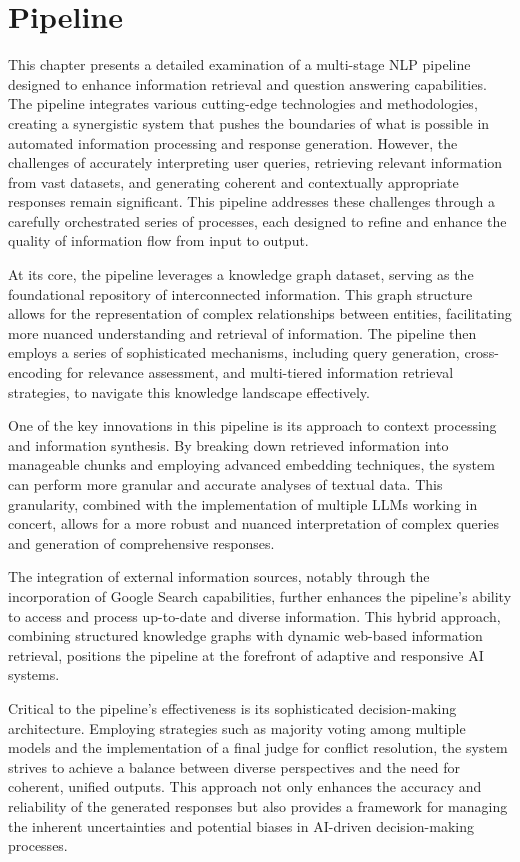\chapter{Pipeline}\label{ch:pipeline}
This chapter presents a detailed examination of a multi-stage NLP pipeline designed to enhance information retrieval and question answering capabilities.
The pipeline integrates various cutting-edge technologies and methodologies, creating a synergistic system that pushes the boundaries of what is possible in automated information processing and response generation.
However, the challenges of accurately interpreting user queries, retrieving relevant information from vast datasets, and generating coherent and contextually appropriate responses remain significant.
This pipeline addresses these challenges through a carefully orchestrated series of processes, each designed to refine and enhance the quality of information flow from input to output.

At its core, the pipeline leverages a knowledge graph dataset, serving as the foundational repository of interconnected information.
This graph structure allows for the representation of complex relationships between entities, facilitating more nuanced understanding and retrieval of information.
The pipeline then employs a series of sophisticated mechanisms, including query generation, cross-encoding for relevance assessment, and multi-tiered information retrieval strategies, to navigate this knowledge landscape effectively.

One of the key innovations in this pipeline is its approach to context processing and information synthesis.
By breaking down retrieved information into manageable chunks and employing advanced embedding techniques, the system can perform more granular and accurate analyses of textual data.
This granularity, combined with the implementation of multiple LLMs working in concert, allows for a more robust and nuanced interpretation of complex queries and generation of comprehensive responses.

The integration of external information sources, notably through the incorporation of Google Search capabilities, further enhances the pipeline's ability to access and process up-to-date and diverse information.
This hybrid approach, combining structured knowledge graphs with dynamic web-based information retrieval, positions the pipeline at the forefront of adaptive and responsive AI systems.

Critical to the pipeline's effectiveness is its sophisticated decision-making architecture.
Employing strategies such as majority voting among multiple models and the implementation of a final judge for conflict resolution, the system strives to achieve a balance between diverse perspectives and the need for coherent, unified outputs.
This approach not only enhances the accuracy and reliability of the generated responses but also provides a framework for managing the inherent uncertainties and potential biases in AI-driven decision-making processes.

